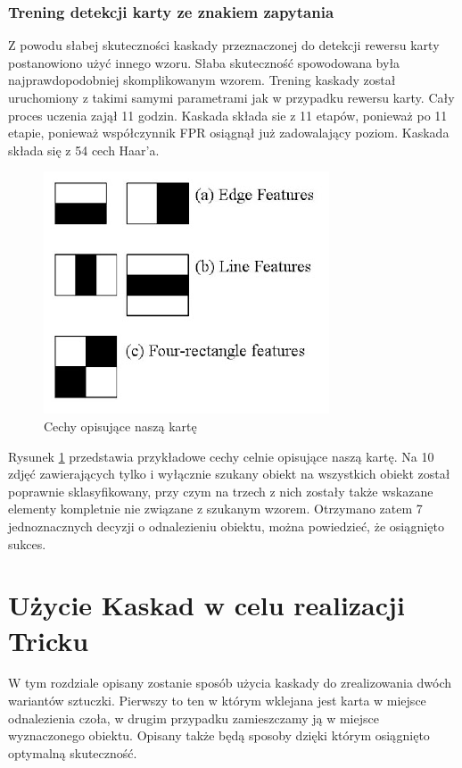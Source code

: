 \documentclass{article}
\let\stdsection\section
\renewcommand\section{\newpage\stdsection}
\numberwithin{equation}{section}
\begin{document}
\subsubsection{Trening detekcji karty ze znakiem zapytania}

Z powodu słabej skuteczności kaskady przeznaczonej do detekcji rewersu karty postanowiono użyć innego wzoru. Słaba skuteczność spowodowana była najprawdopodobniej skomplikowanym wzorem. Trening kaskady został uruchomiony z takimi samymi parametrami jak w przypadku rewersu karty. Cały proces uczenia zajął 11 godzin. Kaskada składa sie z 11 etapów, ponieważ po 11 etapie, ponieważ współczynnik FPR osiągnął już zadowalający poziom. Kaskada składa się z 54 cech Haar'a.

\begin{figure}[H]
\centering
\includegraphics[scale=0.2]{cechy?.png}
\caption{Cechy opisujące naszą kartę}
\label{fig:cechy?}
\end{figure}

Rysunek \ref{fig:cechy?} przedstawia przykładowe cechy celnie opisujące naszą kartę. Na 10 zdjęć zawierających tylko i wyłącznie szukany obiekt na wszystkich obiekt został poprawnie sklasyfikowany, przy czym na trzech z nich zostały także wskazane elementy kompletnie nie związane z szukanym wzorem. Otrzymano zatem 7 jednoznacznych decyzji o odnalezieniu obiektu, można powiedzieć, że osiągnięto sukces.

\section{Użycie Kaskad w celu realizacji Tricku}

W tym rozdziale opisany zostanie sposób użycia kaskady do zrealizowania dwóch wariantów sztuczki. Pierwszy to ten w którym wklejana jest karta w miejsce odnalezienia czoła, w drugim przypadku zamieszczamy ją w miejsce wyznaczonego obiektu. Opisany także będą sposoby dzięki którym osiągnięto optymalną skuteczność.
\end{document}
